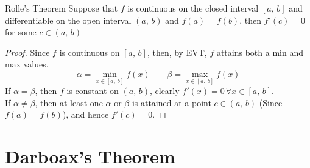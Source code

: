 \documentclass{article}
\renewcommand{\a}{\alpha}
\renewcommand{\b}{\beta}
\begin{document}
{{{{\noindent\begin{theorem}{Rolle's Theorem}{}
   Suppose that $f$ is continuous on the closed interval $[a, \, b]$ and differentiable on the open interval $(a, \, b)$ and $f(a) = f(b)$, then $f'(c) = 0$ for some $c\in (a,\,b)$
\end{theorem}\vspace{10pt}

\begin{figure}[H]
  \centering
\end{figure}
\begin{proof}
  Since $f$ is continuous on $[a,\, b]$, then, by EVT, $f$ attains both a min and max values.
  $$ \a = \min_{x\in [a,\,b]}{f(x)} \qquad \b = \max_{x\in [a,\,b]}{f(x)} $$
  If $\a = \b$, then $f$ is constant on $(a,\, b)$, clearly $f'(x) = 0 \,\forall x\in [a,\, b]$.\\
  If $\a \neq \b$, then at least one $\a$ or $\b$ is attained at a point $c\in (a,\, b)$ (Since $f(a) = f(b)$), and hence $f'(c) = 0$.
\end{proof}

\section{Darboax's Theorem}


}}}}
\end{document}
